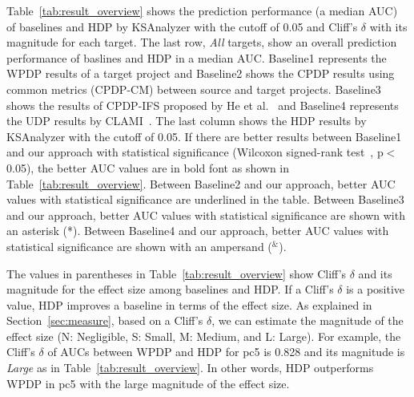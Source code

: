 %


Table~\ref{tab:result_overview} shows the prediction performance (a median AUC)
of baselines and HDP by KSAnalyzer with the cutoff of 0.05 and Cliff's $\delta$ with its magnitude
for each target. The last row, {\em All} targets, show an overall prediction performance of baslines and HDP in a median AUC. Baseline1 represents
the WPDP results of a target project and Baseline2 shows
the CPDP results using common metrics (CPDP-CM) between source and target
projects. Baseline3 shows the results of CPDP-IFS proposed by He et
al.~\cite{He14} and Baseline4 represents the UDP results by CLAMI~\cite{nam2015clami}.
The last column shows the HDP results by KSAnalyzer with the cutoff of 0.05. If there are better results between Baseline1 and our approach with statistical significance (Wilcoxon signed-rank
test~\cite{Wilcoxon45}, p$<$0.05), the better AUC values are in
bold font as shown in Table~\ref{tab:result_overview}.
Between Baseline2 and our approach, better AUC values with
statistical significance are underlined in
the table. Between Baseline3 and our approach, better AUC values with
statistical significance are shown with an asterisk (*).
Between Baseline4 and our approach, better AUC values with
statistical significance are shown with an ampersand ($^{\&}$).

The values in parentheses in Table~\ref{tab:result_overview} show Cliff's $\delta$ and its magnitude for the effect size among baselines and HDP. If a Cliff's $\delta$ is a positive value, HDP improves a baseline in terms of the effect size. As explained in Section~\ref{sec:measure}, based on a Cliff's $\delta$, we can estimate the magnitude of the effect size (N: Negligible, S: Small, M: Medium, and L: Large). For example, the Cliff's $\delta$ of AUCs between WPDP and HDP for pc5 is 0.828 and its magnitude is {\em Large} as in Table~\ref{tab:result_overview}. In other words, HDP outperforms WPDP in pc5 with the large magnitude of the effect size.

